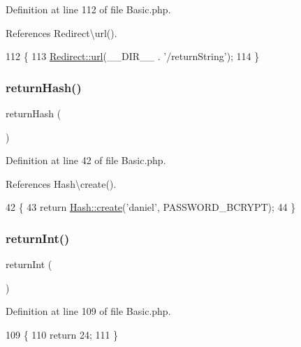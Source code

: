 Definition at line 112 of file Basic.\+php.



References Redirect\textbackslash{}url().


\begin{DoxyCode}
112                                     \{
113         \hyperlink{class_redirect_a8c51feb32df9ae35002451714b7a9a73}{Redirect::url}(\_\_DIR\_\_ . \textcolor{stringliteral}{'/returnString'});
114     \}
\end{DoxyCode}
\hypertarget{class_basic_a16df2136bd66a75022f350d583e6c060}{}\label{class_basic_a16df2136bd66a75022f350d583e6c060} 
\subsubsection{\texorpdfstring{return\+Hash()}{returnHash()}}
{\footnotesize\ttfamily return\+Hash (\begin{DoxyParamCaption}{ }\end{DoxyParamCaption})}



Definition at line 42 of file Basic.\+php.



References Hash\textbackslash{}create().


\begin{DoxyCode}
42                                  \{
43         \textcolor{keywordflow}{return} \hyperlink{class_hash_a8e076eebb2dc8fc9cb289212c79ad9b8}{Hash::create}(\textcolor{stringliteral}{'daniel'}, PASSWORD\_BCRYPT);
44     \}
\end{DoxyCode}
\hypertarget{class_basic_a8d2918087022004ef5ad62d8f76a73d7}{}\label{class_basic_a8d2918087022004ef5ad62d8f76a73d7} 
\subsubsection{\texorpdfstring{return\+Int()}{returnInt()}}
{\footnotesize\ttfamily return\+Int (\begin{DoxyParamCaption}{ }\end{DoxyParamCaption})}



Definition at line 109 of file Basic.\+php.


\begin{DoxyCode}
109                                 \{
110         \textcolor{keywordflow}{return} 24;
111     \}
\end{DoxyCode}
\hypertarget{class_basic_a7cb6a02987f0faaef2ee4aff9198907e}{}\label{class_basic_a7cb6a02987f0faaef2ee4aff9198907e} 
